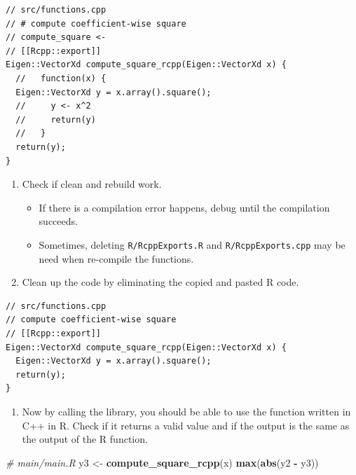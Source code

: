 \documentclass[]{book}
\newenvironment{Shaded}{\begin{snugshade}}{\end{snugshade}}
\newcommand{\KeywordTok}[1]{\textcolor[rgb]{0.13,0.29,0.53}{\textbf{#1}}}
\newcommand{\StringTok}[1]{\textcolor[rgb]{0.31,0.60,0.02}{#1}}
\newcommand{\CommentTok}[1]{\textcolor[rgb]{0.56,0.35,0.01}{\textit{#1}}}
\newcommand{\OperatorTok}[1]{\textcolor[rgb]{0.81,0.36,0.00}{\textbf{#1}}}
\newcommand{\NormalTok}[1]{#1}
\providecommand{\tightlist}{%
  \setlength{\itemsep}{0pt}\setlength{\parskip}{0pt}}
\begin{document}
\begin{verbatim}
// src/functions.cpp
// # compute coefficient-wise square
// compute_square <-
// [[Rcpp::export]]
Eigen::VectorXd compute_square_rcpp(Eigen::VectorXd x) {
  //   function(x) {
  Eigen::VectorXd y = x.array().square();
  //     y <- x^2
  //     return(y)
  //   }
  return(y);
}
\end{verbatim}

\begin{enumerate}
\def\labelenumi{\arabic{enumi}.}
\setcounter{enumi}{8}
\tightlist
\item
  Check if clean and rebuild work.

  \begin{itemize}
  \tightlist
  \item
    If there is a compilation error happens, debug until the compilation
    succeeds.
  \item
    Sometimes, deleting \texttt{R/RcppExports.R} and
    \texttt{R/RcppExports.cpp} may be need when re-compile the
    functions.
  \end{itemize}
\item
  Clean up the code by eliminating the copied and pasted R code.
\end{enumerate}

\begin{verbatim}
// src/functions.cpp
// compute coefficient-wise square
// [[Rcpp::export]]
Eigen::VectorXd compute_square_rcpp(Eigen::VectorXd x) {
  Eigen::VectorXd y = x.array().square();
  return(y);
}
\end{verbatim}

\begin{enumerate}
\def\labelenumi{\arabic{enumi}.}
\setcounter{enumi}{10}
\tightlist
\item
  Now by calling the library, you should be able to use the function
  written in C++ in R. Check if it returns a valid value and if the
  output is the same as the output of the R function.
\end{enumerate}

\begin{Shaded}
\begin{Highlighting}[]
\CommentTok{# main/main.R}
\NormalTok{y3 <-}\StringTok{ }\KeywordTok{compute_square_rcpp}\NormalTok{(x)}
\KeywordTok{max}\NormalTok{(}\KeywordTok{abs}\NormalTok{(y2 }\OperatorTok{-}\StringTok{ }\NormalTok{y3))}
\end{Highlighting}
\end{Shaded}
\end{document}
